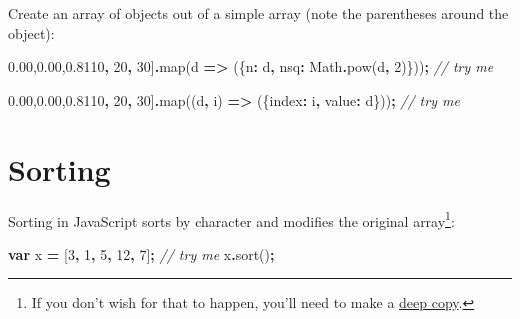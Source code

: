 \documentclass[
  openany]{book}
\newenvironment{Shaded}{\begin{snugshade}}{\end{snugshade}}
\newcommand{\BuiltInTok}[1]{#1}
\newcommand{\CommentTok}[1]{\textcolor[rgb]{0.56,0.35,0.01}{\textit{#1}}}
\newcommand{\DataTypeTok}[1]{\textcolor[rgb]{0.13,0.29,0.53}{#1}}
\newcommand{\DecValTok}[1]{\textcolor[rgb]{0.00,0.00,0.81}{#1}}
\newcommand{\FunctionTok}[1]{\textcolor[rgb]{0.00,0.00,0.00}{#1}}
\newcommand{\KeywordTok}[1]{\textcolor[rgb]{0.13,0.29,0.53}{\textbf{#1}}}
\newcommand{\NormalTok}[1]{#1}
\newcommand{\OperatorTok}[1]{\textcolor[rgb]{0.81,0.36,0.00}{\textbf{#1}}}
\begin{document}
Create an array of objects out of a simple array (note the parentheses around the object):

\begin{Shaded}
\begin{Highlighting}[]
\NormalTok{[}\DecValTok{10}\OperatorTok{,} \DecValTok{20}\OperatorTok{,} \DecValTok{30}\NormalTok{]}\OperatorTok{.}\FunctionTok{map}\NormalTok{(d }\KeywordTok{=\textgreater{}}\NormalTok{ (\{}\DataTypeTok{n}\OperatorTok{:}\NormalTok{ d}\OperatorTok{,} \DataTypeTok{nsq}\OperatorTok{:} \BuiltInTok{Math}\OperatorTok{.}\FunctionTok{pow}\NormalTok{(d}\OperatorTok{,} \DecValTok{2}\NormalTok{)\}))}\OperatorTok{;}  \CommentTok{// try me}
\end{Highlighting}
\end{Shaded}

\begin{Shaded}
\begin{Highlighting}[]
\NormalTok{[}\DecValTok{10}\OperatorTok{,} \DecValTok{20}\OperatorTok{,} \DecValTok{30}\NormalTok{]}\OperatorTok{.}\FunctionTok{map}\NormalTok{((d}\OperatorTok{,}\NormalTok{ i) }\KeywordTok{=\textgreater{}}\NormalTok{ (\{}\DataTypeTok{index}\OperatorTok{:}\NormalTok{ i}\OperatorTok{,} \DataTypeTok{value}\OperatorTok{:}\NormalTok{ d\}))}\OperatorTok{;}  \CommentTok{// try me}
\end{Highlighting}
\end{Shaded}

\hypertarget{sorting}{%
\section{Sorting}\label{sorting}}

Sorting in JavaScript sorts by character and modifies the original array\footnote{If you don't wish for that to happen, you'll need to make a \href{https://medium.com/javascript-in-plain-english/how-to-deep-copy-objects-and-arrays-in-javascript-7c911359b089}{deep copy}.}:

\begin{Shaded}
\begin{Highlighting}[]
\KeywordTok{var}\NormalTok{ x }\OperatorTok{=}\NormalTok{ [}\DecValTok{3}\OperatorTok{,} \DecValTok{1}\OperatorTok{,} \DecValTok{5}\OperatorTok{,} \DecValTok{12}\OperatorTok{,} \DecValTok{7}\NormalTok{]}\OperatorTok{;}     \CommentTok{// try me}
\NormalTok{x}\OperatorTok{.}\FunctionTok{sort}\NormalTok{()}\OperatorTok{;}
\end{Highlighting}
\end{Shaded}
\end{document}
